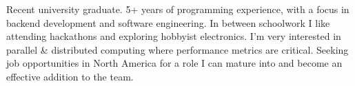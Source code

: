 
\begin{cvparagraph}

Recent university graduate. 5+ years of programming experience, with a focus in backend development and software engineering. In between schoolwork I like attending hackathons and exploring hobbyist electronics. I'm very interested in parallel \& distributed computing where performance metrics are critical. Seeking job opportunities in North America for a role I can mature into and become an effective addition to the team.

\end{cvparagraph}